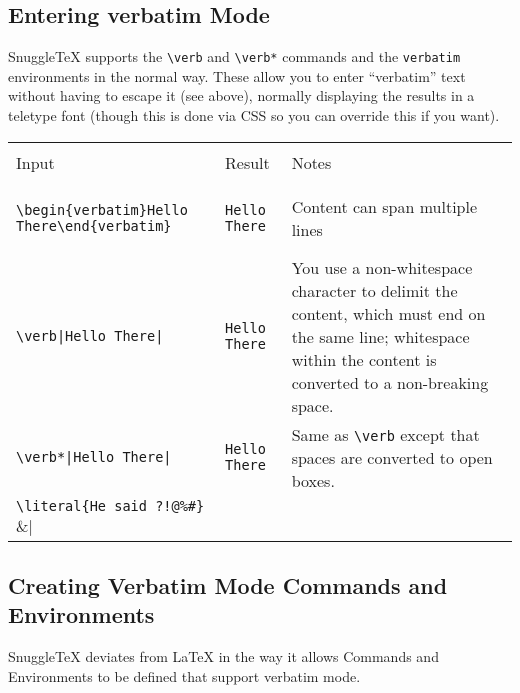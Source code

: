 
\newenvironment{ndemotable}
{\begin{center}
 \begin{tabular}{|l|l|l|}
 \hline \\
 Input & Result & Notes \\
 \hline \\
}{\hline
 \end{tabular}
 \end{center}
}

\subsection*{Entering verbatim Mode}

SnuggleTeX supports the \verb|\verb| and \verb|\verb*| commands and the
\texttt{verbatim} environments in the normal way. These allow you to
enter ``verbatim'' text without having to escape it (see above), normally
displaying the results in a teletype font (though this is done via CSS
so you can override this if you want).

\begin{ndemotable}
\verb|\begin{verbatim}Hello There\end{verbatim}| &
\begin{verbatim}Hello There\end{verbatim} &
Content can span multiple lines \\
\hline
\verb!\verb|Hello There|! &
\verb|Hello There| &
You use a non-whitespace character to delimit the content,
which must end on the same line; whitespace within
the content is converted to a non-breaking space. \\
\hline
\verb!\verb*|Hello There|! &
\verb*|Hello There| &
Same as \verb|\verb| except that spaces are converted
to open boxes. \\
\hline
\verb|\literal{He said ?!@%#}| &
\literal{He said ?!@%
This is specific to SnuggleTeX; it lets you enter
text without escaping but displays it as normal. \\
\end{ndemotable}

\subsection*{Creating Verbatim Mode Commands and Environments}

SnuggleTeX deviates from LaTeX in the way it allows Commands
and Environments to be defined that support verbatim mode.

